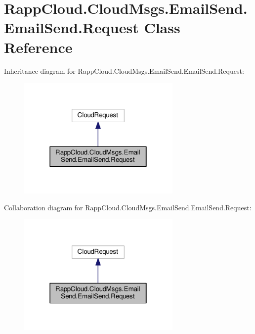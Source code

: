 \hypertarget{classRappCloud_1_1CloudMsgs_1_1EmailSend_1_1EmailSend_1_1Request}{\section{Rapp\-Cloud.\-Cloud\-Msgs.\-Email\-Send.\-Email\-Send.\-Request Class Reference}
\label{classRappCloud_1_1CloudMsgs_1_1EmailSend_1_1EmailSend_1_1Request}
}


Inheritance diagram for Rapp\-Cloud.\-Cloud\-Msgs.\-Email\-Send.\-Email\-Send.\-Request\-:
\nopagebreak
\begin{figure}[H]
\begin{center}
\leavevmode
\includegraphics[width=226pt]{classRappCloud_1_1CloudMsgs_1_1EmailSend_1_1EmailSend_1_1Request__inherit__graph}
\end{center}
\end{figure}


Collaboration diagram for Rapp\-Cloud.\-Cloud\-Msgs.\-Email\-Send.\-Email\-Send.\-Request\-:
\nopagebreak
\begin{figure}[H]
\begin{center}
\leavevmode
\includegraphics[width=226pt]{classRappCloud_1_1CloudMsgs_1_1EmailSend_1_1EmailSend_1_1Request__coll__graph}
\end{center}
\end{figure}
